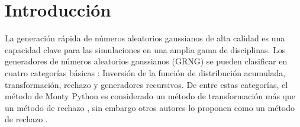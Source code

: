 \maketitle{}

\section{Introducción}
La generación rápida de números aleatorios gaussianos de alta calidad es una capacidad clave para las simulaciones en una amplia gama de disciplinas.
Los generadores de números aleatorios gaussianos (GRNG) se pueden clasificar en cuatro categorías básicas \parencite{Thomas_Random_Generators}:
Inversión de la función de distribución acumulada, transformación, rechazo y generadores recursivos. De entre estas categorías,
el método de Monty Python es considerado un método de transformación más  que un método de rechazo \parencite{Thomas_Random_Generators},
sin embargo otros autores lo proponen como un método de rechazo \parencite{Umeda_Normal_generators}.
\def\bMedio{1.253314}
\def\bInversa{0.3989422804014327}
\def\aIntercept{1.177410} %
\def\sAB{0.8857913124365199} %
\def\b{2.50662}
